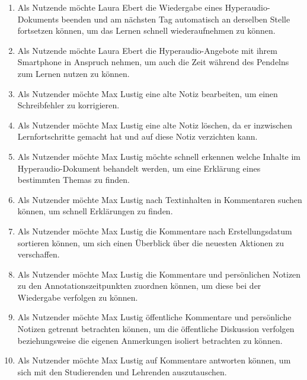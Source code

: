 \begin{enumerate}[label=US-\arabic*:,ref=US-\arabic*]
\item \label{US-Fortsetzen} Als Nutzende möchte Laura Ebert die Wiedergabe eines Hyperaudio-Dokuments beenden und am nächsten Tag automatisch an derselben Stelle fortsetzen können, um das Lernen schnell wiederaufnehmen zu können.

\item \label{US-Mobil} Als Nutzende möchte Laura Ebert die Hyperaudio-Angebote mit ihrem Smartphone in Anspruch nehmen, um auch die Zeit während des Pendelns zum Lernen nutzen zu können.

\item \label{US-Notiz-Bearbeiten} Als Nutzender möchte Max Lustig eine alte Notiz bearbeiten, um einen Schreibfehler zu korrigieren.

\item \label{US-Notiz-Loeschen} Als Nutzender möchte Max Lustig eine alte Notiz löschen, da er inzwischen Lernfortschritte gemacht hat und auf diese Notiz verzichten kann.

\item \label{US-Galerie} Als Nutzender möchte Max Lustig möchte schnell erkennen welche Inhalte im Hyperaudio-Dokument behandelt werden, um eine Erklärung eines bestimmten Themas zu finden.

\item \label{US-Suche} Als Nutzender möchte Max Lustig nach Textinhalten in Kommentaren suchen können, um schnell Erklärungen zu finden.

\item \label{US-Sortierung-Erstellungsdatum} Als Nutzender möchte Max Lustig die Kommentare nach Erstellungsdatum sortieren können, um sich einen Überblick über die neuesten Aktionen zu verschaffen.

\item \label{US-Sortierung-Zeitpunkt} Als Nutzender möchte Max Lustig die Kommentare und persönlichen Notizen zu den Annotationszeitpunkten zuordnen können, um diese bei der Wiedergabe verfolgen zu können.

\item \label{US-Filter} Als Nutzender möchte Max Lustig öffentliche Kommentare und persönliche Notizen getrennt betrachten können, um die öffentliche Diskussion verfolgen beziehungsweise die eigenen Anmerkungen isoliert betrachten zu können.

\item \label{US-Antwort-S} Als Nutzender möchte Max Lustig auf Kommentare antworten können, um sich mit den Studierenden und Lehrenden auszutauschen.


\end{enumerate}
